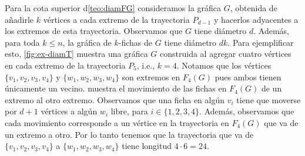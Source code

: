 Para la cota superior d\cref{teo:diamFG} consideramos la gr\'afica $G$, obtenida
de a\~{n}adirle $k$ v\'ertices a cada extremo de la trayectoria $P_{d -1}$ y
hacerlos adyacentes a los extremos de esta trayectoria. Observamos que $G$ tiene
di\'ametro $d$. Adem\'as, para toda $k \leq n$, la gr\'afica de $k$-fichas de
$G$ tiene di\'ametro $dk$. Para ejemplificar esto, \cref{fig:ex-diamT} muestra
una gr\'afica $G$ construida al agregar cuatro v\'ertices en cada extremo de la
trayectoria $P_5$, i.e., $k=4$. Notamos que los v\'ertices $\{v_1,v_2,v_3,v_4\}$
y $\{w_1,w_2,w_3,w_4\}$ son extremos en $F_4(G)$ pues ambos tienen \'unicamente
un vecino.  muestra el movimiento de las fichas en $F_4(G)$
de un extremo al otro extremo. Observamos que una ficha en alg\'un $v_i$ tiene
que moverse por $d +1$ v\'ertices a alg\'un $w_i$ libre, para $i \in
\{1,2,3,4\}$. Adem\'as, observamos que cada movimiento corresponde a un
v\'ertice en la trayectoria en $F_4(G)$ que va de un extremo a otro. Por lo
tanto tenemos que la trayectoria que va de $\{v_1,v_2,v_3,v_4\}$ a
$\{w_1,w_2,w_3,w_4\}$ tiene longitud $4 \cdot 6 = 24$.

\newpage

